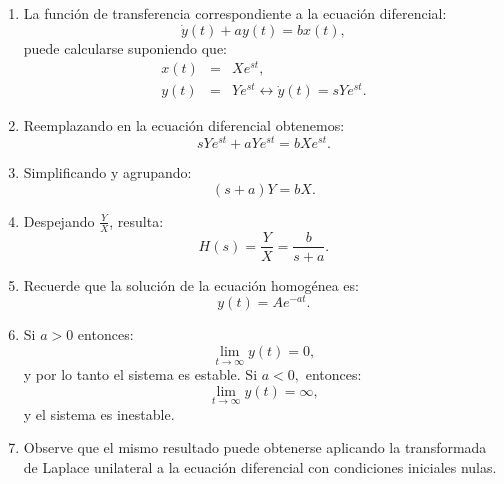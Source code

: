 \documentclass[11pt,a4paper,openany]{book}
\begin{document}
\begin{enumerate}
	\item La funci\'{o}n de transferencia correspondiente a la ecuaci\'{o}n diferencial:
	\begin{equation}
		\dot{y}\left( t\right) +ay\left( t\right) =bx\left( t\right) ,
	\end{equation}
	puede calcularse suponiendo que:
	\begin{eqnarray}
		x\left( t\right) &=& X e^{st}, \\
		y\left( t\right) &=& Y e^{st} \longleftrightarrow \dot{y}\left( t\right) = s Y e^{st}.
	\end{eqnarray}
	
	\item Reemplazando en la ecuaci\'{o}n diferencial obtenemos:
	\begin{equation}
		s Y e^{st} + a Y e^{st} = b X e^{st}.
	\end{equation}
	
	\item Simplificando y agrupando:
	\begin{equation}
		\left( s+a\right) Y = b X.
	\end{equation}
	
	\item Despejando $\frac{Y}{X}$, resulta:
	\begin{equation}
		H\left( s\right) = \frac{Y}{X} = \frac{b}{s+a}.
	\end{equation}
	
	\item Recuerde que la soluci\'{o}n de la ecuaci\'{o}n homog\'{e}nea es: 
	\begin{equation}
		y\left( t\right) = A e^{-at}.
	\end{equation}
	
	\item Si $a>0$ entonces:
	\begin{equation}
		\lim_{t \to \infty} y\left( t\right) = 0,
	\end{equation}
	y por lo tanto el sistema es estable. Si $a<0,$ entonces:
	\begin{equation}
		\lim_{t \to \infty} y\left( t\right) = \infty,
	\end{equation}
	y el sistema es inestable.
	
	\item Observe que el mismo resultado puede obtenerse aplicando la transformada de Laplace unilateral a la ecuaci\'{o}n diferencial con condiciones iniciales nulas.
\end{enumerate}
\end{document}
